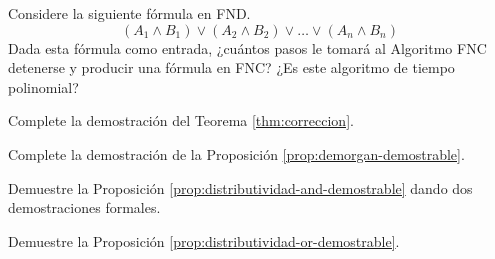 \message{ !name(main.tex)}\documentclass[12pt,a4paper]{book}
\begin{document}
    \begin{ejercicio}
        Considere la siguiente fórmula en FND.
        \begin{equation*}
            (A_{1}\wedge B_{1})\vee(A_{2}\wedge B_{2})\vee\dots\vee(A_{n}\wedge B_{n})
        \end{equation*}
        Dada esta fórmula como entrada, ¿cuántos pasos le tomará al Algoritmo FNC detenerse y producir una fórmula en FNC?
        ¿Es este algoritmo de tiempo polinomial?
    \end{ejercicio}

    \begin{ejercicio}\label{ej:completar-correccion}
        Complete la demostración del Teorema \ref{thm:correccion}.
    \end{ejercicio}

    \begin{ejercicio}\label{ej:completar-demorgan}
        Complete la demostración de la Proposición \ref{prop:demorgan-demostrable}.
    \end{ejercicio}

    \begin{ejercicio}\label{ej:distributividad-and-completa}
        Demuestre la Proposición \ref{prop:distributividad-and-demostrable} dando dos demostraciones formales.
    \end{ejercicio}

    \begin{ejercicio}\label{ej:distributividad-or-completa}
        Demuestre la Proposición \ref{prop:distributividad-or-demostrable}.
    \end{ejercicio}
\end{document}
